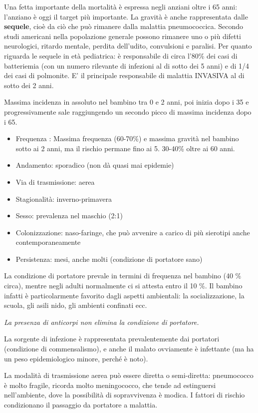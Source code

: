   Una fetta importante della mortalità è espressa negli anziani oltre i
  65 anni: l'anziano è oggi il target più importante. La gravità è anche
  rappresentata dalle \textbf{sequele}, cioè da ciò che può rimanere
  dalla malattia pneumococcica. Secondo studi americani nella
  popolazione generale possono rimanere uno o più difetti neurologici,
  ritardo mentale, perdita dell'udito, convulsioni e paralisi. Per
  quanto riguarda le sequele in età pediatrica: è responsabile di circa
  l'80\% dei casi di batteriemia (con un numero rilevante di infezioni
  al di sotto dei 5 anni) e di 1/4 dei casi di polmonite. E' il
  principale responsabile di malattia INVASIVA al di sotto dei 2 anni.

  Massima incidenza in assoluto nel bambino tra 0 e 2 anni, poi inizia
  dopo i 35 e progressivamente sale raggiungendo un secondo picco di
  massima incidenza dopo i 65.

\begin{itemize}
\item
  Frequenza : Massima frequenza (60-70\%) e massima gravità nel bambino
  sotto ai 2 anni, ma il rischio permane fino ai 5. 30-40\% oltre ai 60
  anni.
\item
  Andamento: sporadico (non dà quasi mai epidemie)
\item
  Via di trasmissione: aerea
\item
  Stagionalità: inverno-primavera
\item
  Sesso: prevalenza nel maschio (2:1)
\item
  Colonizzazione: naso-faringe, che può avvenire a carico di più
  sierotipi anche contemporaneamente
\item
  Persistenza: mesi, anche molti (condizione di portatore sano)
\end{itemize}
  La condizione di portatore prevale in termini di frequenza nel bambino
  (40 \% circa), mentre negli adulti normalmente ci si attesta entro il
  10 \%. Il bambino infatti è particolarmente favorito dagli aspetti
  ambientali: la socializzazione, la scuola, gli asili nido, gli
  ambienti confinati ecc.

  \emph{La presenza di anticorpi non elimina la condizione di
  portatore.}

  La sorgente di infezione è rappresentata prevalentemente dai portatori
  (condizione di commensalismo), e anche il malato ovviamente è
  infettante (ma ha un peso epidemiologico minore, perché è noto).

  La modalità di trasmissione aerea può essere diretta o semi-diretta:
  pneumococco è molto fragile, ricorda molto meningococco, che tende ad
  estinguersi nell'ambiente, dove la possibilità di sopravvivenza è
  modica. I fattori di rischio condizionano il passaggio da portatore a
  malattia.

